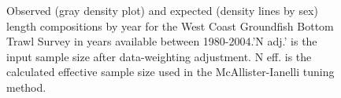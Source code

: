 \documentclass[
]{scrartcl}
\begin{document}
\begin{figure}[H]


\caption{\label{fig-len-fit-wcgbts}Observed (gray density plot) and
expected (density lines by sex) length compositions by year for the West
Coast Groundfish Bottom Trawl Survey in years available between
1980-2004.'N adj.' is the input sample size after data-weighting
adjustment. N eff. is the calculated effective sample size used in the
McAllister-Ianelli tuning method.}

\end{figure}%
\end{document}
